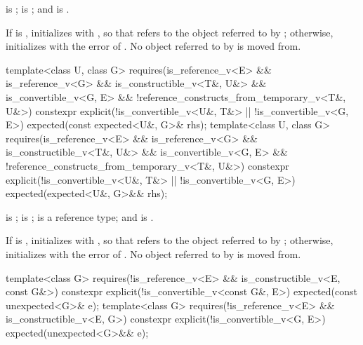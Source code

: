 \begin{itemdescr}
\pnum
\constraints
{} is ;  is ; and  is .

\pnum
\effects
If  is , initializes  with , so that  refers to the object referred to by ; otherwise, initializes  with the error of . No object referred to by  is moved from.
\end{itemdescr}

%
\begin{itemdecl}
template<class U, class G>
  requires(is_reference_v<E> && is_reference_v<G> && is_constructible_v<T&, U&> &&
           is_convertible_v<G, E> && !reference_constructs_from_temporary_v<T&, U&>)
constexpr explicit(!is_convertible_v<U&, T&> || !is_convertible_v<G, E>)
    expected(const expected<U&, G>& rhs);
template<class U, class G>
  requires(is_reference_v<E> && is_reference_v<G> && is_constructible_v<T&, U&> &&
           is_convertible_v<G, E> && !reference_constructs_from_temporary_v<T&, U&>)
constexpr explicit(!is_convertible_v<U&, T&> || !is_convertible_v<G, E>)
    expected(expected<U&, G>&& rhs);
\end{itemdecl}

\begin{itemdescr}
\pnum
\constraints
{} is ;  is ;  is a reference type; and  is .

\pnum
\effects
If  is , initializes  with , so that  refers to the object referred to by ; otherwise, initializes  with the error of . No object referred to by  is moved from.
\end{itemdescr}

%
\begin{itemdecl}
template<class G>
  requires(!is_reference_v<E> && is_constructible_v<E, const G&>)
constexpr explicit(!is_convertible_v<const G&, E>) expected(const unexpected<G>& e);
template<class G>
  requires(!is_reference_v<E> && is_constructible_v<E, G>)
constexpr explicit(!is_convertible_v<G, E>) expected(unexpected<G>&& e);
\end{itemdecl}

